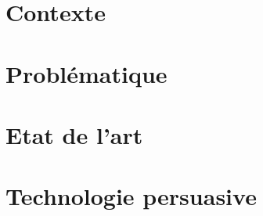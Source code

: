 \documentclass[]{pandoc/sigchi}
\begin{document}
\newcommand{\levelup}%
  {\let\subparagraph\paragraph%
   \let\paragraph\subsubsection%
   \let\subsubsection\subsection%
   \let\subsection\section%
  }

\let\oldsubfloat\subfloat
\renewcommand*{\subfloat}{\hfill\oldsubfloat}


\levelup

\chapter{Contexte}\label{contexte}

\chapter{Problématique}\label{probluxe9matique}

\chapter{Etat de l'art}\label{etat-de-lart}

\chapter{Technologie persuasive}\label{technologie-persuasive}
\end{document}
